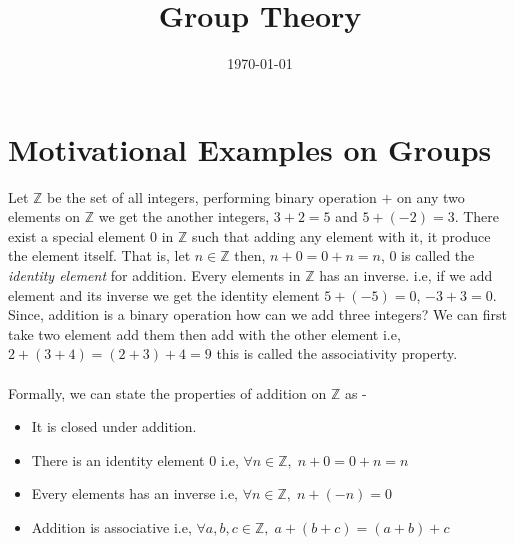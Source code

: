 \documentclass[12pt,a4paper]{article}
\title{Group Theory \vspace{-2em}}
\date{\today}
\newcommand{\Z}{\mathbb{Z}}
\begin{document}
  \maketitle
  \section{Motivational Examples on Groups}
  Let $\Z$ be the set of all integers, performing binary operation $+$ on any two elements on $\Z$ we get the another integers, $3+2=5$ and $5+(-2)=3$. There exist a special element $0$ in $\Z$ such that adding any element with it, it produce the element itself. That is, let $n\in \Z$ then, $n+0=0+n=n$, $0$ is called the \textit{identity element} for addition. Every elements in $\Z$ has an inverse. i.e, if we add element and its inverse we get the identity element $5+(-5)=0$, $-3+3=0$. Since, addition is a binary operation how can we add three integers? We can first take two element add them then add with the other element i.e, $2+(3+4)=(2+3)+4=9$ this is called the associativity property.\\\\
  Formally, we can state the properties of addition on $\Z$ as -
  \begin{itemize}
    \item It is closed under addition.
    \item There is an identity element $0$ i.e, $\forall n\in \Z,\; n+0=0+n=n$
    \item Every elements has an inverse i.e, $\forall n\in \Z,\; n+(-n)=0$ 
    \item Addition is associative i.e, $\forall a,b,c\in \Z,\; a+(b+c)=(a+b)+c$
  \end{itemize}
  
\end{document}
